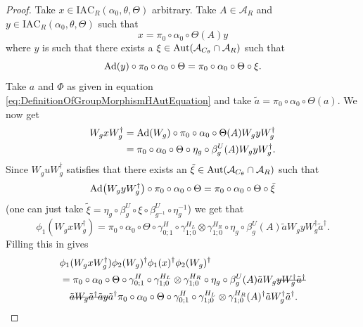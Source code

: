 \documentclass[12pt,a4paper,twoside]{article}
\newcommand{\stkout}[1]{\ifmmode\text{\sout{\ensuremath{#1}}}\else\sout{#1}\fi}
\let\originalleft\left
\let\originalright\right
\renewcommand{\left}{\mathopen{}\mathclose\bgroup\originalleft}
\renewcommand{\right}{\aftergroup\egroup\originalright}
\renewcommand{\AA}{\mathcal A}
\newcommand{\Ad}[1]{\textrm{Ad}\left(#1\right)}
\newcommand{\Aut}[1]{\textrm{Aut}\left(#1\right)}
\theoremstyle{definition}
\numberwithin{equation}{section}
\begin{document}
\begin{proof}
	Take $x\in \textrm{IAC}_R(\alpha_0,\theta,\Theta)$ arbitrary. Take $A\in\AA_R$ and $y\in\textrm{IAC}_R(\alpha_0,\theta,\Theta)$ such that
	\begin{equation}
		x=\pi_0\circ\alpha_0\circ\Theta(A)y
	\end{equation}
	where $y$ is such that there exists a $\xi\in\Aut{\AA_{C_\theta}\cap \AA_R}$ such that
	\begin{equation}
		\Ad{y}\circ\pi_0\circ\alpha_0\circ\Theta=\pi_0\circ\alpha_0\circ\Theta\circ\xi.
	\end{equation}
	Take $a$ and $\Phi$ as given in equation \eqref{eq:DefinitionOfGroupMorphismHAutEquation} and take $\tilde{a}=\pi_0\circ\alpha_0\circ\Theta(a)$. We now get
	\begin{align}
		W_g x W_g^\dagger&=\Ad{W_g}\circ\pi_0\circ\alpha_0\circ\Theta(A) W_gyW_g^\dagger\\
		&=\pi_0\circ\alpha_0\circ\Theta\circ\eta_g\circ\beta_g^U(A) W_gyW_g^\dagger.
	\end{align}
	Since $W_g uW_g^\dagger$ satisfies that there exists an $\tilde{\xi}\in\Aut{\AA_{C_\theta}\cap \AA_R}$ such that
	\begin{equation}
		\Ad{W_gyW_g^\dagger}\circ \pi_0\circ\alpha_0\circ\Theta=\pi_0\circ\alpha_0\circ\Theta\circ\tilde\xi
	\end{equation}
	(one can just take $\tilde\xi=\eta_g\circ\beta_g^U\circ\xi\circ\beta_{g^{-1}}^U\circ\eta_g^{-1}$) we get that
	\begin{equation}
		\phi_1(W_gxW_g^{\dagger})=\pi_0\circ\alpha_0\circ\Theta\circ\gamma^{H}_{0;1}\circ\gamma^{H_L}_{1;0}\otimes\gamma^{H_R}_{1;0}\circ\eta_g\circ\beta_g^U(A)\tilde{a}W_gyW_g^\dagger\tilde{a}^\dagger.
	\end{equation}
	Filling this in gives
	\begin{align}
		&\phi_1(W_gxW_g^\dagger)\phi_2(W_g)^\dagger\phi_1(x)^\dagger\phi_2(W_g)^\dagger\\
		\label{eq:phi1phi2matchingConditionEquation}
		&=\pi_0\circ\alpha_0\circ\Theta\circ\gamma^{H}_{0;1}\circ\gamma^{H_L}_{1;0}\otimes\gamma^{H_R}_{1;0}\circ\eta_g\circ\beta_g^U(A)\tilde{a}W_g\stkout{yW_g^\dagger\tilde{a}^\dagger}\\
		\nonumber
		&\quad\stkout{\tilde{a}W_g\tilde{a}^\dagger\tilde{a}y}\tilde{a}^\dagger\pi_0\circ\alpha_0\circ\Theta\circ\gamma^{H}_{0;1}\circ\gamma^{H_L}_{1;0}\otimes\gamma^{H_R}_{1;0}(A)^\dagger\tilde{a}W_g^\dagger\tilde{a}^\dagger.
	\end{align}

\end{proof}
\end{document}
